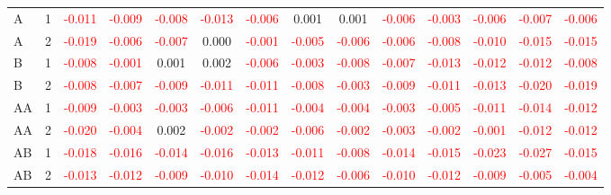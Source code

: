 \begin{table}[H]
{\begin{tabular}{llcccccccccccc}
A & 1 & \textcolor{red}{-0.011} & \textcolor{red}{-0.009} & \textcolor{red}{-0.008} & \textcolor{red}{-0.013} & \textcolor{red}{-0.006} & 0.001 & 0.001 & \textcolor{red}{-0.006} & \textcolor{red}{-0.003} & \textcolor{red}{-0.006} & \textcolor{red}{-0.007} & \textcolor{red}{-0.006}\\
A & 2 & \textcolor{red}{-0.019} & \textcolor{red}{-0.006} & \textcolor{red}{-0.007} & 0.000 & \textcolor{red}{-0.001} & \textcolor{red}{-0.005} & \textcolor{red}{-0.006} & \textcolor{red}{-0.006} & \textcolor{red}{-0.008} & \textcolor{red}{-0.010} & \textcolor{red}{-0.015} & \textcolor{red}{-0.015}\\
B & 1 & \textcolor{red}{-0.008} & \textcolor{red}{-0.001} & 0.001 & 0.002 & \textcolor{red}{-0.006} & \textcolor{red}{-0.003} & \textcolor{red}{-0.008} & \textcolor{red}{-0.007} & \textcolor{red}{-0.013} & \textcolor{red}{-0.012} & \textcolor{red}{-0.012} & \textcolor{red}{-0.008}\\
B & 2 & \textcolor{red}{-0.008} & \textcolor{red}{-0.007} & \textcolor{red}{-0.009} & \textcolor{red}{-0.011} & \textcolor{red}{-0.011} & \textcolor{red}{-0.008} & \textcolor{red}{-0.003} & \textcolor{red}{-0.009} & \textcolor{red}{-0.011} & \textcolor{red}{-0.013} & \textcolor{red}{-0.020} & \textcolor{red}{-0.019}\\
AA & 1 & \textcolor{red}{-0.009} & \textcolor{red}{-0.003} & \textcolor{red}{-0.003} & \textcolor{red}{-0.006} & \textcolor{red}{-0.011} & \textcolor{red}{-0.004} & \textcolor{red}{-0.004} & \textcolor{red}{-0.003} & \textcolor{red}{-0.005} & \textcolor{red}{-0.011} & \textcolor{red}{-0.014} & \textcolor{red}{-0.012}\\
AA & 2 & \textcolor{red}{-0.020} & \textcolor{red}{-0.004} & 0.002 & \textcolor{red}{-0.002} & \textcolor{red}{-0.002} & \textcolor{red}{-0.006} & \textcolor{red}{-0.002} & \textcolor{red}{-0.003} & \textcolor{red}{-0.002} & \textcolor{red}{-0.001} & \textcolor{red}{-0.012} & \textcolor{red}{-0.012}\\
AB & 1 & \textcolor{red}{-0.018} & \textcolor{red}{-0.016} & \textcolor{red}{-0.014} & \textcolor{red}{-0.016} & \textcolor{red}{-0.013} & \textcolor{red}{-0.011} & \textcolor{red}{-0.008} & \textcolor{red}{-0.014} & \textcolor{red}{-0.015} & \textcolor{red}{-0.023} & \textcolor{red}{-0.027} & \textcolor{red}{-0.015}\\
AB & 2 & \textcolor{red}{-0.013} & \textcolor{red}{-0.012} & \textcolor{red}{-0.009} & \textcolor{red}{-0.010} & \textcolor{red}{-0.014} & \textcolor{red}{-0.012} & \textcolor{red}{-0.006} & \textcolor{red}{-0.010} & \textcolor{red}{-0.012} & \textcolor{red}{-0.009} & \textcolor{red}{-0.005} & \textcolor{red}{-0.004}\\

\end{tabular}}
\end{table}

